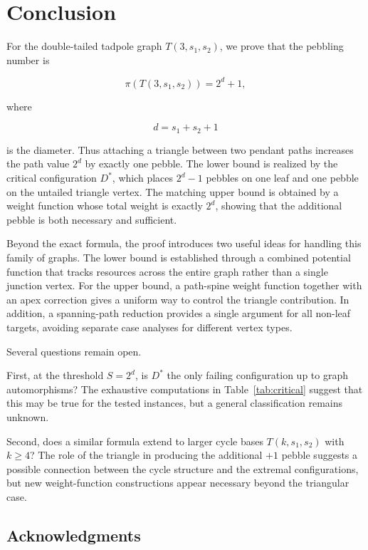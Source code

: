 \section{Conclusion}\label{sec:conclusion}

For the double-tailed tadpole graph $T(3,s_1,s_2)$, we prove that the
pebbling number is

\[
\pi(T(3,s_1,s_2))=2^d+1,
\]

where

\[
d=s_1+s_2+1
\]

is the diameter. Thus attaching a triangle between two pendant paths
increases the path value $2^d$ by exactly one pebble. The lower bound is
realized by the critical configuration $D^*$, which places $2^d-1$ pebbles
on one leaf and one pebble on the untailed triangle vertex. The matching
upper bound is obtained by a weight function whose total weight is exactly
$2^d$, showing that the additional pebble is both necessary and sufficient.

Beyond the exact formula, the proof introduces two useful ideas for handling
this family of graphs. The lower bound is established through a combined
potential function that tracks resources across the entire graph rather than
a single junction vertex. For the upper bound, a path-spine weight function
together with an apex correction gives a uniform way to control the triangle
contribution. In addition, a spanning-path reduction provides a single
argument for all non-leaf targets, avoiding separate case analyses for
different vertex types.

Several questions remain open.

First, at the threshold $S=2^d$, is $D^*$
the only failing configuration up to graph automorphisms? The exhaustive
computations in Table~\ref{tab:critical} suggest that this may be true for
the tested instances, but a general classification remains unknown.

Second, does a similar formula extend to larger cycle bases
$T(k,s_1,s_2)$ with $k\ge4$? The role of the triangle in producing the
additional $+1$ pebble suggests a possible connection between the cycle
structure and the extremal configurations, but new weight-function
constructions appear necessary beyond the triangular case.


\subsection*{Acknowledgments}

